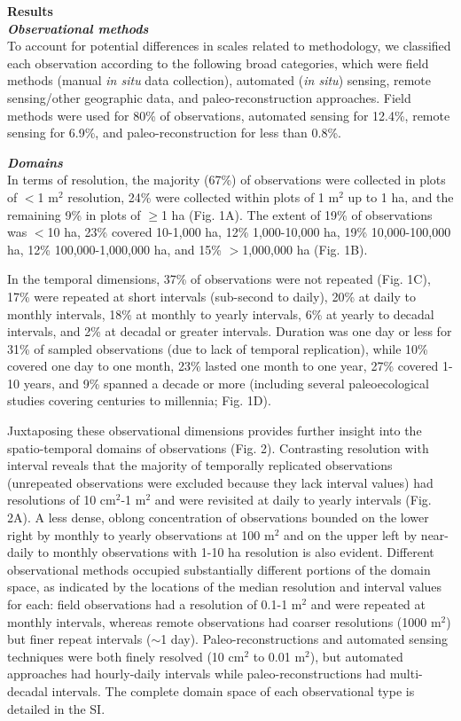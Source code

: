 \documentclass[12pt]{article}
\begin{document}
\noindent \textbf{Results}\\
\noindent \textbf{\emph{Observational methods}}\\
To account for potential differences in scales related to methodology, we classified each observation according to the following broad categories, which were field methods (manual \emph{in situ} data collection), automated (\emph{in situ}) sensing, remote sensing/other geographic data, and paleo-reconstruction approaches. Field methods were used for 80\% of observations, automated sensing for 12.4\%, remote sensing for 6.9\%, and paleo-reconstruction for less than 0.8\%. 

\noindent \textbf{\emph{Domains}}\\
In terms of resolution, the majority (67\%) of observations were collected in plots of $<$1 m$^2$ resolution, 24\% were collected within plots of 1 m$^2$ up to 1 ha, and the remaining 9\% in plots of $\geq$1 ha (Fig. 1A). The extent of 19\% of observations was $<$10 ha, 23\% covered 10-1,000 ha, 12\% 1,000-10,000 ha, 19\% 10,000-100,000 ha, 12\% 100,000-1,000,000 ha, and 15\% $>$1,000,000 ha (Fig. 1B). 


In the temporal dimensions, 37\% of observations were not repeated (Fig. 1C), 17\% were repeated at short intervals (sub-second to daily), 20\% at daily to monthly intervals, 18\% at monthly to yearly intervals, 6\% at yearly to decadal intervals, and 2\% at decadal or greater intervals. Duration was one day or less for 31\% of sampled observations (due to lack of temporal replication), while 10\% covered one day to one month, 23\% lasted one month to one year, 27\% covered 1-10 years, and 9\% spanned a decade or more (including several paleoecological studies covering centuries to millennia; Fig. 1D).

Juxtaposing these observational dimensions provides further insight into the spatio-temporal domains of observations (Fig. 2). Contrasting resolution with interval reveals that the majority of temporally replicated observations (unrepeated observations were excluded because they lack interval values) had resolutions of 10 cm$^2$-1 m$^2$ and were revisited at daily to yearly intervals (Fig. 2A). A less dense, oblong concentration of observations bounded on the lower right by monthly to yearly observations at 100 m$^2$ and on the upper left by near-daily to monthly observations with 1-10 ha resolution is also evident. Different observational methods occupied substantially different portions of the domain space, as indicated by the locations of the median resolution and interval values for each:  field observations had a resolution of 0.1-1 m$^2$ and were repeated at monthly intervals, whereas remote observations had coarser resolutions (1000 m$^2$) but finer repeat intervals ($\sim$1 day). Paleo-reconstructions and automated sensing techniques were both finely resolved (10 cm$^2$ to 0.01 m$^2$), but automated approaches had hourly-daily intervals while paleo-reconstructions had multi-decadal intervals.  The complete domain space of each observational type is detailed in the SI. 
\end{document}
